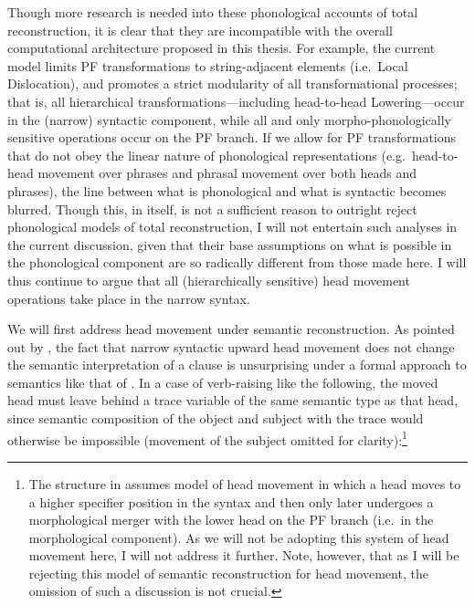 {Though more research is needed into these phonological accounts of total reconstruction, it is clear that they are incompatible with the overall computational architecture proposed in this thesis. For example, the current model limits PF transformations to string-adjacent elements (i.e.\ Local Dislocation), and promotes a strict modularity of all transformational processes; that is, all hierarchical transformations---including head-to-head Lowering---occur in the (narrow) syntactic component, while all and only morpho-phonologically sensitive operations occur on the PF branch. If we allow for PF transformations that do not obey the linear nature of phonological representations (e.g.\ head-to-head movement over phrases and phrasal movement over both heads and phrases), the line between what is phonological and what is syntactic becomes blurred. Though this, in itself, is not a sufficient reason to outright reject phonological models of total reconstruction, I will not entertain such analyses in the current discussion, given that their base assumptions on what is possible in the phonological component are so radically different from those made here. I will thus continue to argue that all (hierarchically sensitive) head movement operations take place in the narrow syntax.}

We will first address head movement under semantic reconstruction. As pointed out by \citet{matushansky2006}, the fact that narrow syntactic upward head movement does not change the semantic interpretation of a clause is unsurprising under a formal approach to semantics like that of \citet{heim_kratzer1998}. In a case of verb-raising like the following, the moved head must leave behind a trace variable of the same semantic type as that head, since semantic composition of the object and subject with the trace would otherwise be impossible (movement of the subject omitted for clarity):\footnote{\label{lambda_head_fn}The structure in \Next assumes  model of head movement in which a head moves to a higher specifier position in the syntax and then only later undergoes a morphological merger with the lower head on the PF branch (i.e.\ in the morphological component). As we will not be adopting this system of head movement here, I will not address it further. Note, however, that as I will be rejecting this model of semantic reconstruction for head movement, the omission of such a discussion is not crucial.}

